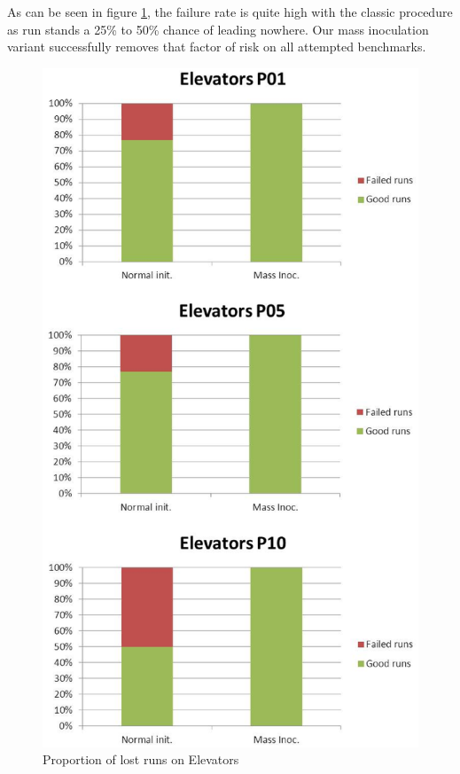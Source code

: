 \documentclass[english]{DESCARWINreport}
\begin{document}
As can be seen in figure \ref{fig:failRate}, the failure rate is quite high with the classic procedure as run stands a 25\% to 50\% chance of leading nowhere. Our mass inoculation variant successfully removes that factor of risk on all attempted benchmarks.

\begin{figure}
	\centering
		\includegraphics[height=0.8\textheight]{pics/failRate_elevators.eps}
	\caption{Proportion of lost runs on Elevators}
	\label{fig:failRate}
\end{figure}
\end{document}
